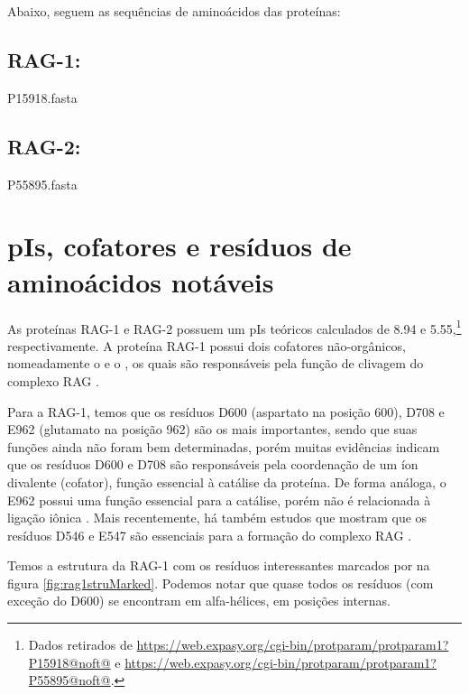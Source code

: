 \documentclass[
	12pt,				%
	openright,			%
	twoside,			%
	a4paper,			%
	]{abntex2}
\begin{document}
Abaixo, seguem as sequências de aminoácidos das proteínas:

\subsection{RAG-1:}
\begin{texshade}{P15918.fasta}
	\noblockskip
	\hideconsensus
\end{texshade}

\subsection{RAG-2:}
\begin{texshade}{P55895.fasta}
	\noblockskip
	\hideconsensus
\end{texshade}

\section{pIs, cofatores e resíduos de aminoácidos notáveis}

As proteínas RAG-1 e RAG-2 possuem um pIs teóricos calculados de 8.94 e 5.55,\footnote{Dados retirados de \url{https://web.expasy.org/cgi-bin/protparam/protparam1?P15918@noft@} e \url{https://web.expasy.org/cgi-bin/protparam/protparam1?P55895@noft@}.} respectivamente. A proteína RAG-1 possui dois cofatores não-orgânicos, nomeadamente o  e o , os quais são responsáveis pela função de clivagem do complexo RAG \cite{RAG1cof}.

Para a RAG-1, temos que os resíduos D600 (aspartato na posição 600), D708 e E962 (glutamato na posição 962) são os mais importantes, sendo que suas funções ainda não foram bem determinadas, porém muitas evidências indicam que os resíduos D600 e D708 são responsáveis pela coordenação de um íon divalente (cofator), função essencial à catálise da proteína. De forma análoga, o E962 possui uma função essencial para a catálise, porém não é relacionada à ligação iônica \cite{impRAG1}. Mais recentemente, há também estudos que mostram que os resíduos D546 e E547 são essenciais para a formação do complexo RAG \cite{newandcool}.

Temos a estrutura da RAG-1 com os resíduos interessantes marcados por  na figura \ref{fig:rag1struMarked}. Podemos notar que quase todos os resíduos (com exceção do D600) se encontram em alfa-hélices, em posições internas.
\end{document}

